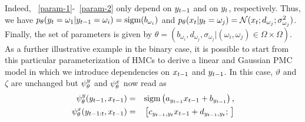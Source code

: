\begin{example}
  Indeed, ~\eqref{param-1}-~\eqref{param-2}
  only depend on $y_{t-1}$ and on $y_t$, respectively. 
  Thus, we have  $p_{\theta}(y_t=\omega_1|y_{t-1}=\omega_i)={\rm sigm}(b_{\omega_i})$ 
  and $p_{\theta}(x_t|y_t=\omega_j)=\mathcal{N}(x_t;d_{\omega_j};\sigma^2_{\omega_j})$. 
  Finally, the set of parameters is given by
  $\theta=(b_{\omega_i},d_{\omega_j},\sigma_{\omega_j}|(\omega_i,\omega_j) \in \Omega \times \Omega)$.
  As a further illustrative example in the binary case,
  it is possible to start from this particular parameterization of HMCs to derive a linear and Gaussian PMC model in which we introduce
  dependencies on $x_{t-1}$ and $y_{t-1}$. In this case,
  $\vartheta$ and $\zeta$ are unchanged but $\psi^{y}_{\theta}$
  and $\psi^{x}_{\theta}$ now read as
  \begin{eqnarray}
  \label{param-1_bis}
  \psi^{y}_{\theta}(y_{t-1},x_{t-1})&=&{\rm sigm}\left(a_{y_{t-1}}x_{t-1}+b_{y_{t-1}}\right) \text{,} \\
  \label{param-2_bis}
   \psi^{x}_{\theta}(y_{t-1:t},x_{t-1}) &=& \begin{bmatrix} c_{y_{t-1},y_{t}}x_{t-1}+ d_{y_{t-1},y_{t}}; \

\end{bmatrix}
\end{eqnarray}
\end{example}
